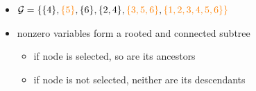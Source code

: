 \documentclass[a0]{a0poster}
\begin{document}
\begin{textblock}{7.0}
\begin{itemize}\itemsep=8pt
    \item $\mathcal G = \{ \{4\}, \textcolor{orange}{\{5\}}, \{6\}, \{2,4\}, 
        \textcolor{orange}{\{3,5,6\}}, \textcolor{orange}{\{1,2,3,4,5,6\} \}}$
\item nonzero variables form a rooted and connected subtree
    \begin{itemize}
        \item if node is selected, so are its ancestors
        \item if node is not selected, neither are its descendants
    \end{itemize}
\end{itemize}

\end{textblock}
\end{document}
